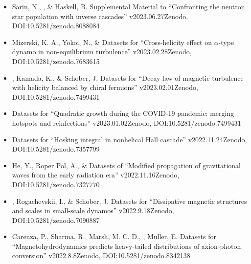 \begin{itemize}
\item[{42.}~]
Sarin, N., \Brandenburg, \& Haskell, B.
{Supplemental Material to ``Confronting the neutron star population with inverse cascades'' v2023.06.27}{Zenodo, DOI:10.5281/zenodo.8088084}

\item[{41.}~]
Mizerski, K. A., Yokoi, N., \& \Brandenburg{}
{Datasets for ``Cross-helicity effect on $\alpha$-type dynamo in non-equilibrium turbulence'' v2023.02.28}{Zenodo, DOI:10.5281/zenodo.7683615}

\item[{40.}~]
\Brandenburg, Kamada, K., \& Schober, J.
{Datasets for ``Decay law of magnetic turbulence with helicity balanced by chiral fermions'' v2023.02.01}{Zenodo, DOI:10.5281/zenodo.7499431}

\item[{39.}~]
\Brandenburg{}
{Datasets for ``Quadratic growth during the COVID-19 pandemic: merging hotspots and reinfections'' v2023.01.02}{Zenodo, DOI:10.5281/zenodo.7499431}

\item[{38.}~]
\Brandenburg{}
{Datasets for ``Hosking integral in nonhelical Hall cascade'' v2022.11.24}{Zenodo, DOI:10.5281/zenodo.7357799}

\item[{37.}~]
He, Y., Roper Pol, A., \& \Brandenburg{}
{Datasets of ``Modified propagation of gravitational waves from the early radiation era'' v2022.11.16}{Zenodo, DOI:10.5281/zenodo.7327770}

\item[{36.}~]
\Brandenburg, Rogachevskii, I., \& Schober, J.
{Datasets for ``Dissipative magnetic structures and scales in small-scale dynamos'' v2022.9.18}{Zenodo, DOI:10.5281/zenodo.7090887}

\item[{35.}~]
Carenza, P., Sharma, R., Marsh, M. C. D., \Brandenburg, M\"uller, E.
{Datasets for ``Magnetohydrodynamics predicts heavy-tailed distributions of axion-photon conversion'' v2022.8.8}{Zenodo, DOI:10.5281/zenodo.8342138}


\end{itemize}
